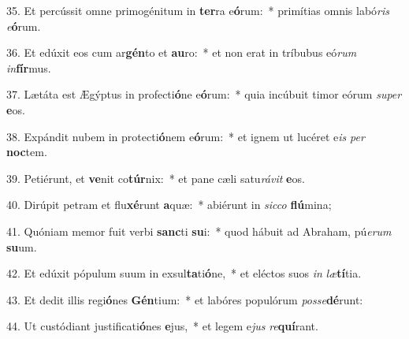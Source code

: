 35. Et percússit omne primogénitum in \textbf{ter}ra e\textbf{ó}rum:~*  primítias omnis labó\textit{ris} \textit{e}\textbf{ó}rum.\

36. Et edúxit eos cum ar\textbf{gén}to et \textbf{au}ro:~*  et non erat in tríbubus eó\textit{rum} \textit{in}\textbf{fír}mus.\

37. Lætáta est Ægýptus in profecti\textbf{ó}ne e\textbf{ó}rum:~*  quia incúbuit timor eórum \textit{su}\textit{per} \textbf{e}os.\

38. Expándit nubem in protecti\textbf{ó}nem e\textbf{ó}rum:~*  et ignem ut lucéret e\textit{is} \textit{per} \textbf{noc}tem.\

39. Petiérunt, et \textbf{ve}nit co\textbf{túr}nix:~*  et pane cæli satu\textit{rá}\textit{vit} \textbf{e}os.\

40. Dirúpit petram et flu\textbf{xé}runt \textbf{a}quæ:~*  abiérunt in \textit{sic}\textit{co} \textbf{flú}mina;\

41. Quóniam memor fuit verbi \textbf{sanc}ti \textbf{su}i:~*  quod hábuit ad Abraham, pú\textit{e}\textit{rum} \textbf{su}um.\

42. Et edúxit pópulum suum in exsul\textbf{ta}ti\textbf{ó}ne,~*  et eléctos suos \textit{in} \textit{læ}\textbf{tí}tia.\

43. Et dedit illis regi\textbf{ó}nes \textbf{Gén}tium:~*  et labóres populórum \textit{pos}\textit{se}\textbf{dé}runt:\

44. Ut custódiant justificati\textbf{ó}nes \textbf{e}jus,~*  et legem e\textit{jus} \textit{re}\textbf{quí}rant.\

